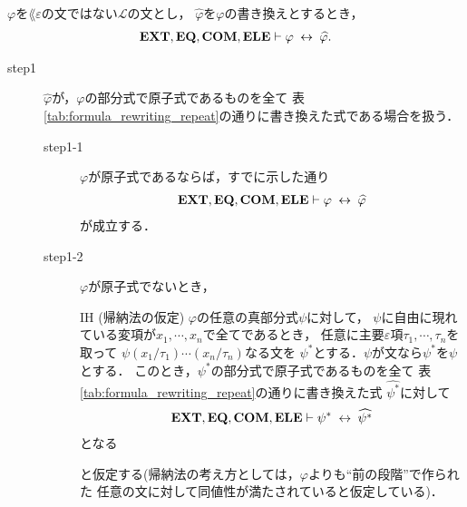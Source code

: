 	\begin{screen}
		\begin{thm}[書き換えの同値性]
		\label{thm:equivalence_of_formula_rewritings}
			$\varphi$を$\lang{\varepsilon}$の文ではない$\mathcal{L}$の文とし，
			$\widehat{\varphi}$を$\varphi$の書き換えとするとき，
			\begin{align}
				\mbox{{\bf EXT}},\mbox{{\bf EQ}},\mbox{\bf COM},\mbox{{\bf ELE}} \vdash \varphi \hspace{0.25em}\leftrightarrow\hspace{0.25em} \widehat{\varphi}.
			\end{align}
		\end{thm}
	\end{screen}
	
	\begin{sketch}\mbox{}
		\begin{description}
			\item[step1] $\widehat{\varphi}$が，$\varphi$の部分式で原子式であるものを全て
				表\ref{tab:formula_rewriting_repeat}の通りに書き換えた式である場合を扱う．
				\begin{description}
					\item[step1-1] $\varphi$が原子式であるならば，すでに示した通り
						\begin{align}
							\mbox{{\bf EXT}},\mbox{{\bf EQ}},\mbox{\bf COM},\mbox{{\bf ELE}} \vdash \varphi \hspace{0.25em}\leftrightarrow\hspace{0.25em} \widehat{\varphi}
						\end{align}
						が成立する．
							
					\item[step1-2] $\varphi$が原子式でないとき，
						\begin{itembox}[l]{IH (帰納法の仮定)}
							$\varphi$の任意の真部分式$\psi$に対して，
							$\psi$に自由に現れている変項が$x_{1},\cdots,x_{n}$で全てであるとき，
							任意に主要$\varepsilon$項$\tau_{1},\cdots,\tau_{n}$を取って
							$\psi(x_{1}/\tau_{1})\cdots(x_{n}/\tau_{n})$なる文を
							$\psi^{*}$とする．$\psi$が文なら$\psi^{*}$を$\psi$とする．
							このとき，$\psi^{*}$の部分式で原子式であるものを全て
							表\ref{tab:formula_rewriting_repeat}の通りに書き換えた式\footnotemark
							$\widehat{\psi^{*}}$に対して
							\begin{align}
								\mbox{{\bf EXT}},\mbox{{\bf EQ}},\mbox{\bf COM},\mbox{{\bf ELE}} \vdash \psi^{*} \hspace{0.25em}\leftrightarrow\hspace{0.25em} \widehat{\psi^{*}}
							\end{align}
							となる
						\end{itembox}
						と仮定する(帰納法の考え方としては，$\varphi$よりも``前の段階''で作られた
						任意の文に対して同値性が満たされていると仮定している)．
						
						

\end{description}
\end{description}
\end{sketch}
